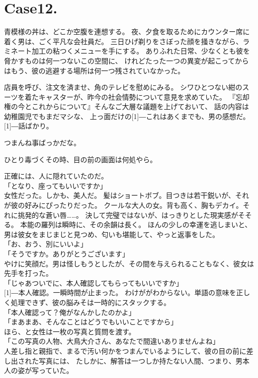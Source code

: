 \documentclass[../NenokuniMain]{subfiles}
\begin{document}
\section{Case12.}
青模様の丼は、どこか空腹を連想する。
夜、夕食を取るためにカウンター席に着く男は、ごく平凡な会社員だ。
三日ひげ剃りをさぼった顔を掻きながら、ラミネート加工の粘つくメニューを手にする。
ありふれた日常、少なくとも彼を脅かすものは何一つないこの空間に、
けれどたった一つの異変が起こってからはもう、彼の逃避する場所は何一つ残されていなかった。

店員を呼び、注文を済ませ、角のテレビを慰めにみる。
シワひとつない紺のスーツを着たキャスターが、昨今の社会情勢について意見を求めていた。
『忘却権の今とこれからについて』そんなご大層な議題を上げておいて、
話の内容は幼稚園児でもまだマシな、
上っ面だけの\scalebox{2}[1]{―}これはあくまでも、男の感想だ。\scalebox{2}[1]{―}話ばかり。

つまんね事ばっかだな。

ひとり毒づくその時、目の前の画面は何処やら。

正確には、人に隠れていたのだ。\\
「となり、座ってもいいですか」\\
女性だった。しかも、美人だ。
髪はショートボブ。目つきは若干鋭いが、それが彼の好みにぴったりだった。
クールな大人の女。背も高く、胸もデカイ。それに挑発的な蒼い唇……。
決して完璧ではないが、はっきりとした現実感がそそる。
本能の羅列は瞬時に、その余韻は長く。
ほんの少しの幸運を逃しまいと、男は彼女をまじまじと見つめ、匂いも堪能して、やっと返事をした。\\
「お、おう、別にいいよ」\\
「そうですか。ありがとうございます」\\
やけに笑顔だ。男は怪しもうとしたが、その間を与えられることもなく、彼女は先手を打った。\\
「じゃあついでに、本人確認してもらってもいいですか」\\
\scalebox{2}[1]{―}本人確認。一瞬時間が止まった。
わけががわからない。単語の意味を正しく処理できず、彼の脳みそは一時的にスタックする。\\
「本人確認って？俺がなんかしたのかよ」\\
「まあまあ、そんなことはどうでもいいことですから」\\
ほら、と女性は一枚の写真と質問を渡す。\\
「この写真の人物、大鳥大介さん、あなたで間違いありませんよね」\\
人差し指と親指で、まるで汚い何かをつまんでいるようにして、彼の目の前に差し出された写真には、
たしかに、解答は一つしか持たない人間、つまり、男本人の姿が写っていた。
\end{document}
